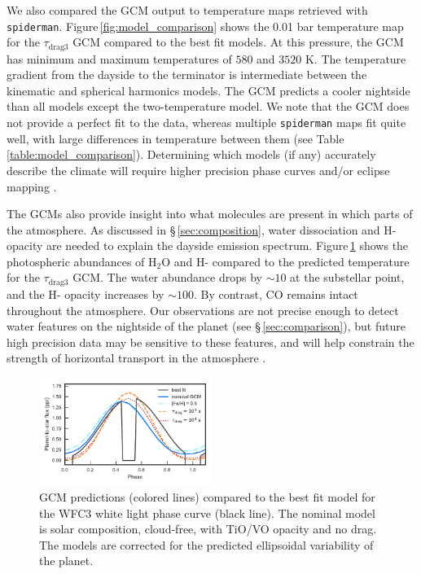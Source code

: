 \documentclass[twocolumn]{aastex61}
\begin{document}
We also compared the GCM output to temperature maps retrieved with \texttt{spiderman}. Figure\,\ref{fig:model_comparison} shows the 0.01 bar temperature map for the $\tau_\mathrm{drag3}$ GCM compared to the best fit models. At this pressure, the GCM has minimum and maximum temperatures of $580$ and $3520$ K. The temperature gradient from the dayside to the terminator is intermediate between the kinematic and spherical harmonics models. The GCM predicts a cooler nightside than all models except the two-temperature model. We note that the GCM does not provide a perfect fit to the data, whereas multiple \texttt{spiderman} maps fit quite well, with large differences in temperature between them (see Table \,\ref{table:model_comparison}). Determining which models (if any) accurately describe the climate will require higher precision phase curves and/or eclipse mapping \citep[e.g.][]{dewit12}. 

The GCMs also provide insight into what molecules are present in which parts of the atmosphere. As discussed in \S\,\ref{sec:composition}, water dissociation and H- opacity are needed to explain the dayside emission spectrum. Figure\,\ref{fig:gcmcomparison} shows the photospheric abundances of H$_2$O and H- compared to the predicted temperature for the $\tau_\mathrm{drag3}$ GCM. The water abundance drops by $\sim10$ at the substellar point, and the H- opacity increases by $\sim100$.  By contrast, CO remains intact throughout the atmosphere.  Our observations are not precise enough to detect water features on the nightside of the planet (see \S\,\ref{sec:comparison}), but future high precision data may be sensitive to these features, and will help constrain the strength of horizontal transport in the atmosphere \citep{agundez14}.

\begin{figure}
\includegraphics[width = 0.5\textwidth]{Figures/gcm_comparison.pdf}
\caption{GCM predictions (colored lines) compared to the best fit model for the WFC3 white light phase curve (black line). The nominal model is solar composition, cloud-free, with TiO/VO opacity and no drag. The models are corrected for the predicted ellipsoidal variability of the planet.}
\label{fig:gcmcomparison}
\end{figure}
\end{document}
